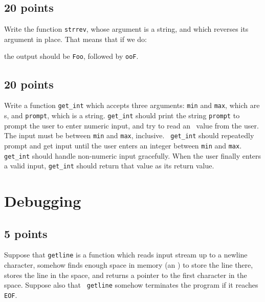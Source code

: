 \subsection{20 points}

Write the function {\tt strrev}, whose argument is a string, and which
reverses its argument in place.  That means that if we do:

\noindent the output should be {\tt Foo}, followed by {\tt ooF}.

\subsection{20 points}

Write a function {\tt get\_int} which accepts three arguments: {\tt min}
and {\tt max}, which are \int s, and {\tt prompt}, which is a string.
{\tt get\_int} should print the string {\tt prompt} to prompt the user
to enter numeric input, and try to read an \int\ value from the user.
The input must be between {\tt min} and {\tt max}, inclusive.  {\tt
get\_int} should repeatedly prompt and get input until the user enters
an integer between {\tt min} and {\tt max}.  {\tt get\_int} should
handle non-numeric input gracefully.  When the user finally enters a
valid input, {\tt get\_int} should return that value as its return
value.

\section{Debugging}

\subsection{5 points}

Suppose that {\tt getline} is a function which reads input stream up to
a newline character, somehow finds enough space in memory (an \ao\Char)
to store the line there, stores the line in the space, and returns a
pointer to the first character in the space.  Suppose also that {\tt
getline} somehow terminates the program if it reaches {\tt EOF}.

